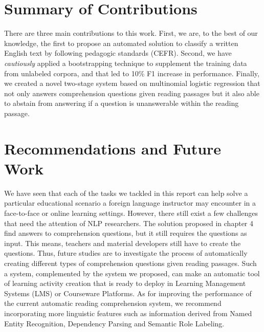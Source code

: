 \section{Summary of Contributions}

There are three main contributions to this work. First, we are, to the best of our knowledge, the first to propose an automated solution to classify a written English text by following pedagogic standards (CEFR). Second, we have \emph{cautiously} applied a bootstrapping technique to supplement the training data from unlabeled corpora, and that led to 10\% F1 increase in performance. Finally, we created a novel two-stage system based on multinomial logistic regression that not only answers comprehension questions given reading passages but it also able to abstain from answering if a question is unanswerable within the reading passage. 

\section{Recommendations and Future Work}

We have seen that each of the tasks we tackled in this report can help solve a particular educational scenario a foreign language instructor may encounter in a face-to-face or online learning settings. However, there still exist a few challenges that need the attention of NLP researchers. The solution proposed in chapter 4 find answers to comprehension questions, but it still requires the questions as input. This means, teachers and material developers still have to create the questions. Thus, future studies are to investigate the process of automatically creating different types of comprehension questions given reading passages. Such a system, complemented by the system we proposed, can make an automatic tool of learning activity creation that is ready to deploy in Learning Management Systems (LMS) or Courseware Platforms. As for improving the performance of the current automatic reading comprehension system, we recommend incorporating more linguistic features such as information derived from Named Entity Recognition, Dependency Parsing and Semantic Role Labeling. 

